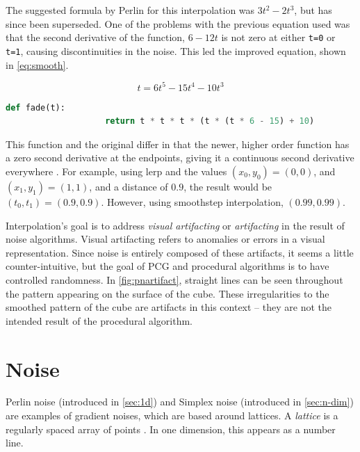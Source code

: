 \documentclass[10pt]{report}
\begin{document}
			The suggested formula by Perlin for this interpolation was \(3t^2 - 2t^3\), but has since been superseded. One of the problems with the previous equation used was that the second derivative of the function, \(6-12t\) is not zero at either \lstinline|t=0| or \lstinline|t=1|, causing discontinuities in the noise. This led the improved equation, shown in \autoref{eq:smooth}\cite{10.1145/566654.566636}. 
			
			\begin{equation} \label{eq:smooth}
				t = 6t^5 - 15t^4 - 10t^3
			\end{equation}
		
			\begin{lstlisting}[label={lst:fadee}, language=Python, frame=none, caption={Smooth-step interpolation implementation, suggested by Perlin.}, captionpos=b]
				def fade(t):
					return t * t * t * (t * (t * 6 - 15) + 10)
			\end{lstlisting}
			
			This function and the original differ in that the newer, higher order function has a zero second derivative at the endpoints, giving it a continuous second derivative everywhere \cite{simplex-demyst}. For example, using lerp and the values \((x_0,y_0) = (0,0)\), and \((x_1,y_1) = (1,1)\), and a distance of \(0.9\), the result would be \((t_0, t_1) = (0.9, 0.9)\). However, using smoothstep interpolation, \((0.99, 0.99)\).
			
			Interpolation's goal is to address \emph{visual artifacting} or \emph{artifacting} in the result of noise algorithms. Visual artifacting refers to anomalies or errors in a visual representation. Since noise is entirely composed of these artifacts, it seems a little counter-intuitive, but the goal of PCG and procedural algorithms is to have controlled randomness. In \autoref{fig:pnartifact}, straight lines can be seen throughout the pattern appearing on the surface of the cube. These irregularities to the smoothed pattern of the cube are artifacts in this context -- they are not the intended result of the procedural algorithm.
			
	\vspace{10pt}
	\let\clearpage\relax
	\chapter{Noise}
		
		Perlin noise (introduced in \autoref{sec:1d}) and Simplex noise (introduced in \autoref{sec:n-dim}) are examples of gradient noises, which are based around lattices. A \emph{lattice} is a regularly spaced array of points \cite{integer-lattice}. In one dimension, this appears as a number line. 
		
\end{document}
